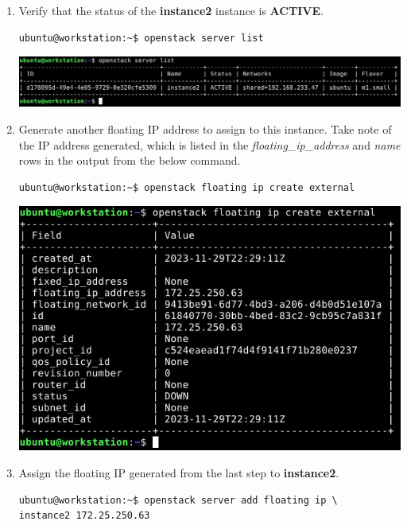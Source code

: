 \documentclass[letterpaper, 12pt]{article}
\begin{document}
\begin{enumerate}
    \item Verify that the status of the \textbf{instance2} instance is \textbf{ACTIVE}.
\begin{lstlisting}
ubuntu@workstation:~$ openstack server list
\end{lstlisting}

    \begin{center}
        \includegraphics[width=\linewidth]{images/part1/step36.png}
    \end{center}

    \item Generate another floating IP address to assign to this instance. Take note of the IP address generated, which
    is listed in the \textit{floating\_ip\_address} and \textit{name} rows in the output from the below command.
\begin{lstlisting}
ubuntu@workstation:~$ openstack floating ip create external
\end{lstlisting}

    \begin{center}
        \includegraphics[width=\linewidth]{images/part1/step37.png}
    \end{center}

    \item Assign the floating IP generated from the last step to \textbf{instance2}.
\begin{lstlisting}
ubuntu@workstation:~$ openstack server add floating ip \
instance2 172.25.250.63
\end{lstlisting}


\end{enumerate}
\end{document}
